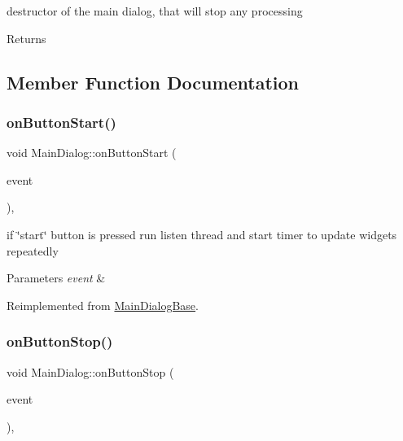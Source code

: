 destructor of the main dialog, that will stop any processing 

\begin{DoxyReturn}{Returns}

\end{DoxyReturn}


\subsection{Member Function Documentation}
\mbox{\label{classMainDialog_a4feedd725b68a028c72c2227c4c55976}} 
\subsubsection{\texorpdfstring{on\+Button\+Start()}{onButtonStart()}}
{\footnotesize\ttfamily void Main\+Dialog\+::on\+Button\+Start (\begin{DoxyParamCaption}\item[{wx\+Command\+Event \&}]{event }\end{DoxyParamCaption})\hspace{0.3cm}{\ttfamily [protected]}, {\ttfamily [virtual]}}



if \char`\"{}start\char`\"{} button is pressed run listen thread and start timer to update widgets repeatedly 


\begin{DoxyParams}{Parameters}
{\em event} & \\
\hline
\end{DoxyParams}


Reimplemented from \hyperlink{classMainDialogBase}{Main\+Dialog\+Base}.

\mbox{\label{classMainDialog_a505dcb8188eafd19d3fe21b382ec7fe7}} 
\subsubsection{\texorpdfstring{on\+Button\+Stop()}{onButtonStop()}}
{\footnotesize\ttfamily void Main\+Dialog\+::on\+Button\+Stop (\begin{DoxyParamCaption}\item[{wx\+Command\+Event \&}]{event }\end{DoxyParamCaption})\hspace{0.3cm}{\ttfamily [protected]}, {\ttfamily [virtual]}}



